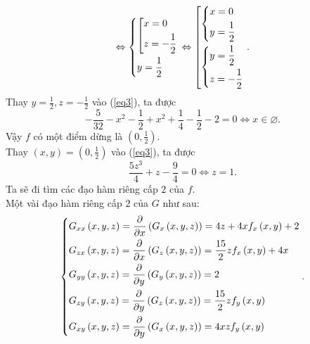 \documentclass[12pt,a4paper]{article}
\begin{document}
\[ \Leftrightarrow \left\{ \begin{gathered}
  \left[ \begin{gathered}
  x = 0 \hfill \\
  z =  - \frac{1}{2} \hfill \\ 
\end{gathered}  \right. \hfill \\
  y = \frac{1}{2} \hfill \\ 
\end{gathered}  \right. \Leftrightarrow \left[ \begin{gathered}
  \left\{ \begin{gathered}
  x = 0 \hfill \\
  y = \frac{1}{2} \hfill \\ 
\end{gathered}  \right. \hfill \\
  \left\{ \begin{gathered}
  y = \frac{1}{2} \hfill \\
  z =  - \frac{1}{2} \hfill \\ 
\end{gathered}  \right. \hfill \\ 
\end{gathered}  \right..\]
Thay \(y = \frac{1}{2}, z = -\frac{1}{2}\) vào (\ref{eq3}), ta được
\[ - \frac{5}{{32}} - {x^2} - \frac{1}{2} + {x^2} + \frac{1}{4} - \frac{1}{2} - 2 = 0 \Leftrightarrow x \in \varnothing .\]
Vậy \(f\) có một điểm dừng là \(\left( {0,\frac{1}{2}} \right).\)\\
Thay \(\left( {x,y} \right) = \left( {0,\frac{1}{2}} \right)\) vào (\ref{eq3}), ta được
\[\frac{{5{z^3}}}{4} + z - \frac{9}{4} = 0 \Leftrightarrow z = 1.\]
Ta sẽ đi tìm các đạo hàm riêng cấp \(2\) của \(f.\)\\
Một vài đạo hàm riêng cấp \(2\) của \(G\) như sau:
\[\left\{ \begin{gathered}
  {G_{xx}}\left( {x,y,z} \right) = \frac{\partial }{{\partial x}}\left( {{G_x}\left( {x,y,z} \right)} \right) = 4z + 4x{f_x}\left( {x,y} \right) + 2 \hfill \\
  {G_{zx}}\left( {x,y,z} \right) = \frac{\partial }{{\partial x}}\left( {{G_z}\left( {x,y,z} \right)} \right) = \frac{{15}}{2}z{f_x}\left( {x,y} \right) + 4x \hfill \\
  {G_{yy}}\left( {x,y,z} \right) = \frac{\partial }{{\partial y}}\left( {{G_y}\left( {x,y,z} \right)} \right) = 2 \hfill \\
  {G_{zy}}\left( {x,y,z} \right) = \frac{\partial }{{\partial y}}\left( {{G_z}\left( {x,y,z} \right)} \right) = \frac{{15}}{2}z{f_y}\left( {x,y} \right) \hfill \\
  {G_{xy}}\left( {x,y,z} \right) = \frac{\partial }{{\partial y}}\left( {{G_x}\left( {x,y,z} \right)} \right) = 4xz{f_y}\left( {x,y} \right) \hfill \\ 
\end{gathered}  \right..\]
\end{document}
